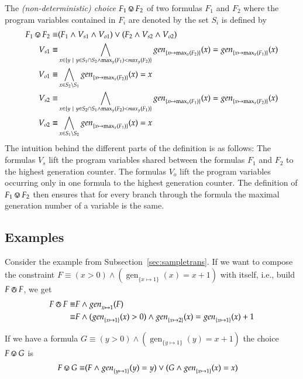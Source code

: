 \documentclass[a4paper,12pt]{article}
\newcommand\gen[1]{\mathop{gen}\nolimits_{#1}}
\newcommand\seqcomp{\circledwedge}
\newcommand\choicecomp{\circledvee}
\begin{document}
The \emph{(non-deterministic) choice} $F_1\choicecomp F_2$ of two formulas $F_1$ and $F_2$ where the program variables contained in $F_i$ are denoted by the set $S_i$ is defined by
\begin{align*}
F_1\choicecomp F_2\equiv&(F_1\land V_{s1}\land V_{o1}) \lor (F_2\land V_{s2}\land V_{o2})\\
V_{s1}\equiv&\bigwedge_{x\in \{y\ |\ y \in S_1\cap S_2 \land \max_y(F_1) < max_y(F_2)\}} \gen{\{x\mapsto\max_x(F_2)\}}(x) = \gen{\{x\mapsto\max_x(F_1)\}}(x)\\
V_{o1}\equiv&\bigwedge_{x\in S_2\setminus S_1}\gen{\{x\mapsto\max_x(F_2)\}}(x) = x\\
V_{s2}\equiv&\bigwedge_{x\in \{y\ |\ y \in S_2\cap S_1 \land \max_y(F_2) < max_y(F_1)\}} \gen{\{x\mapsto\max_x(F_1)\}}(x) = \gen{\{x\mapsto\max_x(F_2)\}}(x)\\
V_{o2}\equiv&\bigwedge_{x\in S_1\setminus S_2}\gen{\{x\mapsto\max_x(F_1)\}}(x) = x
\end{align*}
The intuition behind the different parts of the definition is as follows:
The formulas $V_s$ lift the program variables shared between the formulas $F_1$ and $F_2$ to the highest generation counter.
The formulas $V_o$ lift the program variables occurring only in one formula to the highest generation counter.
The definition of $F_1\choicecomp F_2$ then ensures that for every branch through the formula the maximal generation number of a variable is the same.

\subsection{Examples}
Consider the example from Subsection~\ref{sec:sampletrans}.
If we want to compose the constraint $F\equiv (x > 0) \land (\gen{\{x\mapsto 1\}}(x) = x + 1)$ with itself, i.e., build $F\seqcomp F$, we get 
\begin{align*}
F\seqcomp F\equiv&F\land\gen{x\mapsto 1}(F)\\
\equiv&F\land(\gen{\{x\mapsto 1\}}(x) > 0)\land \gen{\{x\mapsto 2\}}(x) = \gen{\{x\mapsto 1\}}(x) + 1
\end{align*}

If we have a formula $G\equiv (y > 0) \land (\gen{\{y\mapsto 1\}}(y) = x + 1)$ the choice $F\choicecomp G$ is
\begin{align*}
F\choicecomp G\equiv&(F\land\gen{\{y\mapsto 1\}}(y)=y)\lor(G\land\gen{\{x\mapsto 1\}}(x)=x)
\end{align*}
\end{document}
